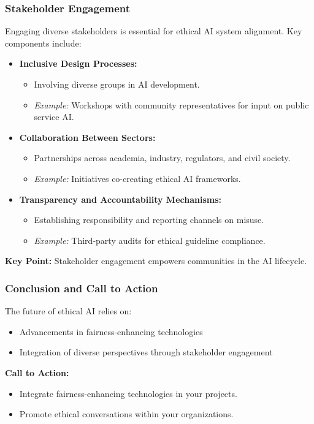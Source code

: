 \documentclass{beamer}
\begin{document}
\begin{frame}[fragile]
    \frametitle{Stakeholder Engagement}
    Engaging diverse stakeholders is essential for ethical AI system alignment. Key components include:
    \begin{itemize}
        \item \textbf{Inclusive Design Processes:}
            \begin{itemize}
                \item Involving diverse groups in AI development.
                \item \textit{Example:} Workshops with community representatives for input on public service AI.
            \end{itemize}
        \item \textbf{Collaboration Between Sectors:}
            \begin{itemize}
                \item Partnerships across academia, industry, regulators, and civil society.
                \item \textit{Example:} Initiatives co-creating ethical AI frameworks.
            \end{itemize}
        \item \textbf{Transparency and Accountability Mechanisms:}
            \begin{itemize}
                \item Establishing responsibility and reporting channels on misuse.
                \item \textit{Example:} Third-party audits for ethical guideline compliance.
            \end{itemize}
    \end{itemize}
    \textbf{Key Point:} Stakeholder engagement empowers communities in the AI lifecycle.
\end{frame}

\begin{frame}[fragile]
    \frametitle{Conclusion and Call to Action}
    The future of ethical AI relies on:
    \begin{itemize}
        \item Advancements in fairness-enhancing technologies 
        \item Integration of diverse perspectives through stakeholder engagement
    \end{itemize}
    \textbf{Call to Action:}
    \begin{itemize}
        \item Integrate fairness-enhancing technologies in your projects.
        \item Promote ethical conversations within your organizations.
    \end{itemize}
\end{frame}
\end{document}

